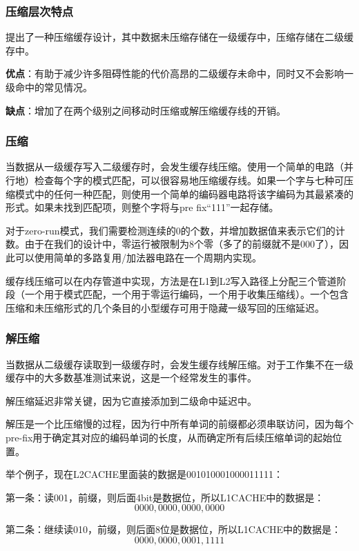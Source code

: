 \documentclass[12pt]{article}
\begin{document}
\subsubsection{压缩层次特点}
提出了一种压缩缓存设计，其中数据未压缩存储在一级缓存中，压缩存储在二级缓存中。

\textbf{优点}：有助于减少许多阻碍性能的代价高昂的二级缓存未命中，同时又不会影响一级命中的常见情况。

\textbf{缺点}：增加了在两个级别之间移动时压缩或解压缩缓存线的开销。

\subsubsection{压缩}
当数据从一级缓存写入二级缓存时，会发生缓存线压缩。使用一个简单的电路（并行地）检查每个字的模式匹配，可以很容易地压缩缓存线。如果一个字与七种可压缩模式中的任何一种匹配，则使用一个简单的编码器电路将该字编码为其最紧凑的形式。如果未找到匹配项，则整个字将与pre fix“111”一起存储。

对于zero-run模式，我们需要检测连续的0的个数，并增加数据值来表示它们的计数。由于在我们的设计中，零运行被限制为8个零（多了的前缀就不是000了），因此可以使用简单的多路复用/加法器电路在一个周期内实现。

缓存线压缩可以在内存管道中实现，方法是在L1到L2写入路径上分配三个管道阶段（一个用于模式匹配，一个用于零运行编码，一个用于收集压缩线）。一个包含压缩和未压缩形式的几个条目的小型缓存可用于隐藏一级写回的压缩延迟。


\subsubsection{解压缩}

当数据从二级缓存读取到一级缓存时，会发生缓存线解压缩。对于工作集不在一级缓存中的大多数基准测试来说，这是一个经常发生的事件。

解压缩延迟非常关键，因为它直接添加到二级命中延迟中。
  
解压是一个比压缩慢的过程，因为行中所有单词的前缀都必须串联访问，因为每个pre-fix用于确定其对应的编码单词的长度，从而确定所有后续压缩单词的起始位置。
  
举个例子，现在L2CACHE里面装的数据是001010001000011111：

  第一条：读001，前缀，则后面4bit是数据位，所以L1CACHE中的数据是：
  \[
  0000, 0000, 0000, 0000
  \]
  
  第二条：继续读010，前缀，则后面8位是数据位，所以L1CACHE中的数据是：
  \[
  0000, 0000, 0001, 1111
  \]
\end{document}
